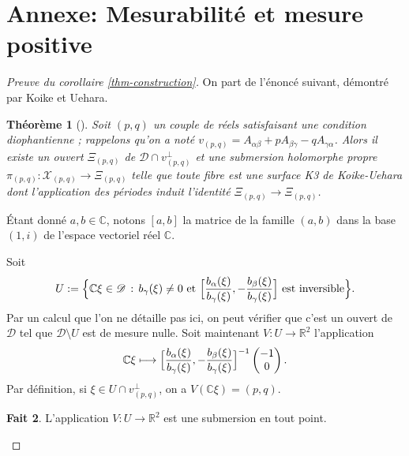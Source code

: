 \documentclass[JEP,XML,SOM,Unicode,francais,published]{cedram}
\newcommand\mto{\mathchoice{\longmapsto}{\mapsto}{\mapsto}{\mapsto}}
\newcommand{\R}{\mathbb{R}}
\newcommand{\C}{\mathbb{C}}
\newtheorem{thm}{Théorème}
\theoremstyle{definition}
\newtheorem{fait}[thm]{Fait}
\begin{document}
\section*{Annexe: Mesurabilité et mesure positive}
\begin{proof}[Preuve du corollaire \ref{thm-construction}]
On part de l'énoncé suivant, démontré par Koike et Uehara.
\begin{thm}[{\cite[Th.\,1.6]{koike2019gluing}}]
\label{koike-uehara}
Soit $(p, q)$ un couple de réels satisfaisant une condition diophantienne ; rappelons qu'on a noté $v_{(p, q)} = A_{\alpha\beta} + pA_{\beta\gamma} - qA_{\gamma\alpha}$. Alors il existe un ouvert $\Xi_{(p, q)}$ de $\mathscr{D} \cap v_{(p,q)}^\perp$ et une submersion holomorphe propre $\pi_{(p, q)} \colon \mathcal{X}_{(p, q)}\to \Xi_{(p, q)}$ telle que toute fibre est une surface K3 de Koike-Uehara dont l'application des périodes induit l'identité $\Xi_{(p,q)} \to \Xi_{(p, q)}$.
\end{thm}
Étant donné $a, b \in \C$, notons $[a, b]$ la matrice de la famille $(a, b)$ dans la base $(1, i)$ de l'espace vectoriel réel $\C$.

Soit \[U:= \Bigl\{\C\xi \in \mathscr{D}\,:\,b_{\gamma}(\xi)\neq 0\text{ et } \Bigl[\frac{b_{\alpha}(\xi)}{b_{\gamma}(\xi)}, -\frac{b_{\beta}(\xi)}{b_{\gamma}(\xi)} \Bigr] \text{ est inversible}\Bigr\}.\]
Par un calcul que l'on ne détaille pas ici, on peut vérifier que c'est un ouvert de $\mathscr{D}$ tel que $\mathscr{D}\setminus U$ est de mesure nulle.
Soit maintenant $V \colon U \to \R^2$ l'application
\[\C\xi \mto \Bigl[\frac{b_{\alpha}(\xi)}{b_{\gamma}(\xi)}, -\frac{b_{\beta}(\xi)}{b_{\gamma}(\xi)} \Bigr]^{-1}\begin{pmatrix}-1 \\ 0\end{pmatrix}.\]
Par définition, si $\xi \in U \cap v_{(p, q)}^{\perp}$, on a $V(\C\xi) = (p, q)$.

\begin{fait}
\label{claim-submersion}
L'application $V \colon U \to \R^2$ est une submersion en tout point.
\end{fait}


\end{proof}
\end{document}
